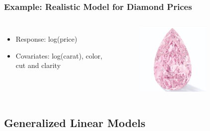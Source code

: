 \begin{frame}
	\frametitle{Example: Realistic Model for Diamond Prices}
	\begin{columns}
		\begin{itemize}
			\item Response: log(price)
			\item Covariates: log(carat), color, cut and clarity
		\end{itemize}
		
		\begin{figure}
			\includegraphics[width=0.7\textwidth]{pics/dia2.png}
		\end{figure}
	\end{columns}
\end{frame}

\subsection{Generalized Linear Models}

